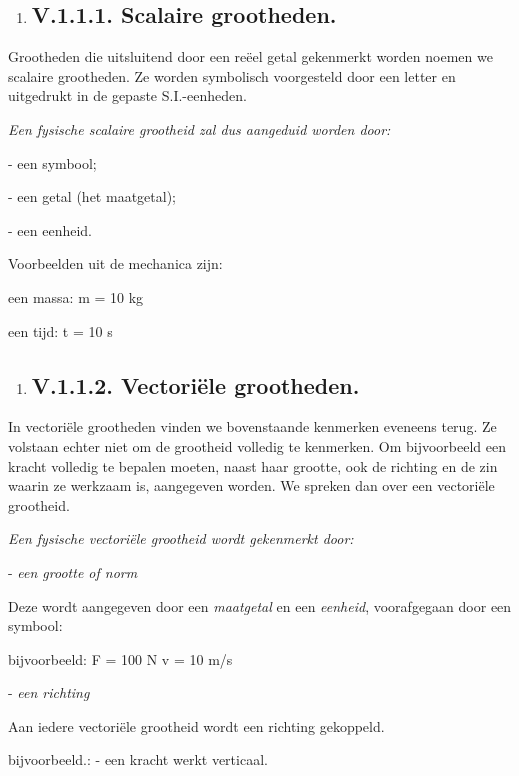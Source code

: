 \documentclass[]{article}
\date{}
\begin{document}
\begin{enumerate}
\item
  \subsection{V.1.1.1. Scalaire
  grootheden.}\label{v.1.1.1.-scalaire-grootheden.}
\end{enumerate}

Grootheden die uitsluitend door een reëel getal gekenmerkt worden noemen
we scalaire grootheden. Ze worden symbolisch voorgesteld door een letter
en uitgedrukt in de gepaste S.I.-eenheden.

\emph{Een fysische scalaire grootheid zal dus aangeduid worden door:}

- een symbool;

- een getal (het maatgetal);

- een eenheid.

Voorbeelden uit de mechanica zijn:

een massa: m = 10 kg

een tijd: t = 10 s

\begin{enumerate}
\item
  \subsection{V.1.1.2. Vectoriële
  grootheden.}\label{v.1.1.2.-vectoriuxeble-grootheden.}
\end{enumerate}

In vectoriële grootheden vinden we bovenstaande kenmerken eveneens
terug. Ze volstaan echter niet om de grootheid volledig te kenmerken. Om
bijvoorbeeld een kracht volledig te bepalen moeten, naast haar grootte,
ook de richting en de zin waarin ze werkzaam is, aangegeven worden. We
spreken dan over een vectoriële grootheid.

\emph{Een fysische vectoriële grootheid wordt gekenmerkt door:}

- \emph{een grootte of norm}

Deze wordt aangegeven door een \emph{maatgetal} en een \emph{eenheid},
voorafgegaan door een symbool:

bijvoorbeeld: F = 100 N v = 10 m/s

- \emph{een richting}

Aan iedere vectoriële grootheid wordt een richting gekoppeld.

bijvoorbeeld.: - een kracht werkt verticaal.
\end{document}
